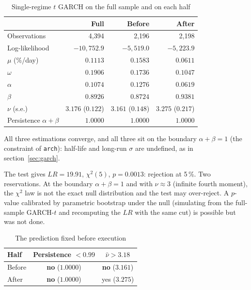 \documentclass[12pt,a4paper]{article}
\begin{document}
\begin{table}[H]
	\centering
	\caption{Single-regime $t$ GARCH on the full sample and on each half}
	\label{tab:chow}
	\begin{tabular}{lrrr}
		\toprule
		& Full & Before & After \\
		\midrule
		Observations & 4,394 & 2,196 & 2,198 \\
		Log-likelihood & $-10{,}752.9$ & $-5{,}519.0$ & $-5{,}223.9$ \\
		$\mu$ (\%/day) & $0.1113$ & $0.1583$ & $0.0611$ \\
		$\omega$ & $0.1906$ & $0.1736$ & $0.1047$ \\
		$\alpha$ & $0.1074$ & $0.1276$ & $0.0619$ \\
		$\beta$ & $0.8926$ & $0.8724$ & $0.9381$ \\
		$\nu$ (s.e.) & $3.176$ ($0.122$) & $3.161$ ($0.148$) & $3.275$ ($0.217$) \\
		Persistence $\alpha+\beta$ & $1.0000$ & $1.0000$ & $1.0000$ \\
		\bottomrule
	\end{tabular}
\end{table}

All three estimations converge, and all three sit on the boundary $\alpha+\beta=1$ (the constraint of \texttt{arch}): half-life and long-run $\sigma$ are undefined, as in section~\ref{sec:garch}.

The test gives $LR = 19.91$, $\chi^2(5)$, $p = 0.0013$: rejection at 5\,\%. Two reservations. At the boundary $\alpha+\beta=1$ and with $\nu\approx 3$ (infinite fourth moment), the $\chi^2$ law is not the exact null distribution and the test may over-reject. A $p$-value calibrated by parametric bootstrap under the null (simulating from the full-sample GARCH-$t$ and recomputing the $LR$ with the same cut) is possible but was not done.

\begin{table}[H]
	\centering
	\caption{The prediction fixed before execution}
	\label{tab:era-prediction}
	\begin{tabular}{lcc}
		\toprule
		Half & Persistence $<0.99$ & $\hat\nu>3.18$ \\
		\midrule
		Before & \textbf{no} ($1.0000$) & \textbf{no} ($3.161$) \\
		After & \textbf{no} ($1.0000$) & yes ($3.275$) \\
		\bottomrule
	\end{tabular}
\end{table}
\end{document}
